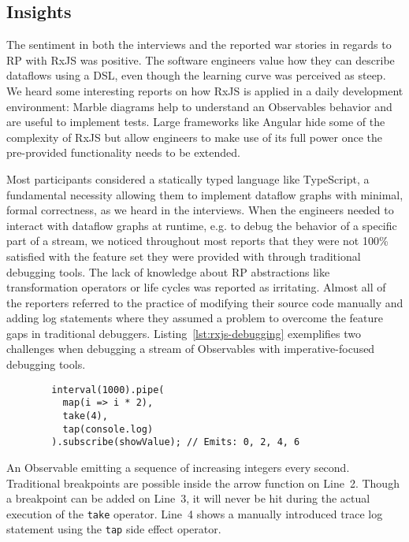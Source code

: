 \documentclass[sigplan,screen,review]{acmart}
\begin{document}
\subsection{Insights}

The sentiment in both the interviews and the reported war stories in regards to RP with RxJS was positive. The software engineers value how they can describe dataflows using a DSL, even though the learning curve was perceived as steep. We heard some interesting reports on how RxJS is applied in a daily development environment: Marble diagrams help to understand  an Observables behavior and are useful to implement tests. Large frameworks like Angular hide some of the complexity of RxJS but allow engineers to make use of its full power once the pre-provided functionality needs to be extended.

Most participants considered a statically typed language like TypeScript, a fundamental necessity allowing them to implement dataflow graphs with minimal, formal correctness, as we heard in the interviews. When the engineers needed to interact with dataflow graphs at runtime, e.g. to debug the behavior of a specific part of a stream, we noticed throughout most reports that they were not 100\% satisfied with the feature set they were provided with through traditional debugging tools. The lack of knowledge about RP abstractions like transformation operators or life cycles was reported as irritating. Almost all of the reporters referred to the practice of modifying their source code manually and adding log statements where they assumed a problem to overcome the feature gaps in traditional debuggers. Listing~\ref{lst:rxjs-debugging} exemplifies two challenges when debugging a stream of Observables with imperative-focused debugging tools.

\begin{listing}
	\begin{verbatim}
		interval(1000).pipe(
		  map(i => i * 2),
		  take(4),
		  tap(console.log)
		).subscribe(showValue); // Emits: 0, 2, 4, 6
	\end{verbatim}
	\caption{An Observable emitting a sequence of increasing integers every second. Traditional breakpoints are possible inside the arrow function on Line~2. Though a breakpoint can be added on Line~3, it will never be hit during the actual execution of the \texttt{take} operator. Line~4 shows a manually introduced trace log statement using the \texttt{tap} side effect operator.}
	\label{lst:rxjs-debugging}
\end{listing}
\end{document}
